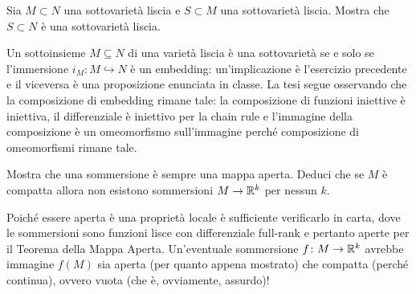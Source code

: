 \documentclass[a4paper]{article}
\begin{document}
\begin{ex}[2.3]{Sia $ M \subset N $ una sottovarietà liscia e $ S \subset M $ una sottovarietà
		liscia. Mostra che $ S \subset N $ è una sottovarietà liscia.}
	
	Un sottoinsieme $ M \subseteq N $ di una varietà liscia è una sottovarietà se e solo se l'immersione $ i_M\colon M \hookrightarrow N $ è un embedding: un'implicazione è l'esercizio precedente e il viceversa è una proposizione enunciata in classe. La tesi segue osservando che la composizione di embedding rimane tale: la composizione di funzioni iniettive è iniettiva, il differenziale è iniettivo per la chain rule e l'immagine della composizione è un omeomorfismo sull'immagine perché composizione di omeomorfismi rimane tale.
\end{ex}

\begin{ex}[2.4]{Mostra che una sommersione è sempre una mappa aperta.
		Deduci che se $ M  $ è compatta allora non esistono sommersioni $ M \to \mathbb{R}^k $ per
		nessun $k$.}
	
	Poiché essere aperta è una proprietà locale è sufficiente verificarlo in carta, dove le sommersioni sono funzioni lisce con differenziale full-rank e pertanto aperte per il Teorema della Mappa Aperta. Un'eventuale sommersione $ f \colon M \to \mathbb{R}^k $ avrebbe immagine $ f(M) $ sia aperta (per quanto appena mostrato) che compatta (perché continua), ovvero vuota (che è, ovviamente, assurdo)!
\end{ex}
\end{document}
